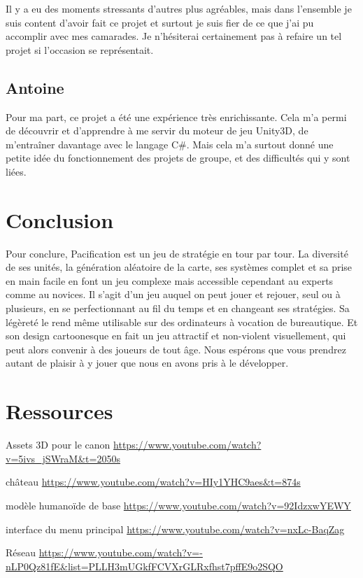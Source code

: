 \documentclass[12pt]{report}
\begin{document}
Il y a eu des moments stressants d’autres plus agréables, mais dans l’ensemble
je suis content d’avoir fait ce projet et surtout je suis fier de ce que j’ai pu
accomplir avec mes camarades. Je n’hésiterai certainement pas à refaire un tel
projet si l’occasion se représentait. 


\section{Antoine}

Pour ma part, ce projet a été une expérience très enrichissante. Cela m’a permi
de découvrir et d’apprendre à me servir du moteur de jeu Unity3D, de m'entraîner
davantage avec le langage C\#. Mais cela m’a surtout donné une petite idée du
fonctionnement des projets de groupe, et des difficultés qui y sont liées.

\chapter{Conclusion}

Pour conclure, Pacification est un jeu de stratégie en tour par tour. La
diversité de ses unités, la génération aléatoire de la carte, ses systèmes
complet et sa prise en main facile en font un jeu complexe mais accessible
cependant au experts comme au novices. Il s’agit d’un jeu auquel on peut jouer
et rejouer, seul ou à plusieurs, en se perfectionnant au fil du temps et en
changeant ses stratégies. Sa légèreté le rend même utilisable sur des
ordinateurs à vocation de bureautique. Et son design cartoonesque en fait un jeu
attractif et non-violent visuellement, qui peut alors convenir à des joueurs de
tout âge.  Nous espérons que vous prendrez autant de plaisir à y jouer que nous
en avons pris à le développer.

\chapter{Ressources}

Assets 3D
pour le canon
\url{https://www.youtube.com/watch?v=5ivs_jSWraM&t=2050s}

château
\url{https://www.youtube.com/watch?v=HIy1YHC9aes&t=874s}

modèle humanoïde de base
\url{https://www.youtube.com/watch?v=92IdzxwYEWY}

interface du menu principal
\url{https://www.youtube.com/watch?v=nxLc-BaqZag}

Réseau
\url{https://www.youtube.com/watch?v=-nLP0Qz81fE&list=PLLH3mUGkfFCVXrGLRxfhst7pffE9o2SQO}
\end{document}
